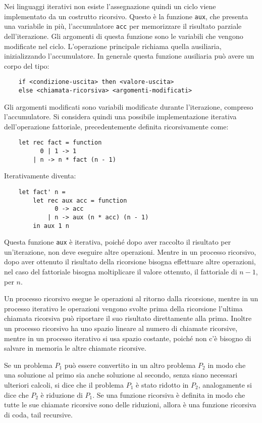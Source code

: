 \documentclass{article}
\numberwithin{equation}{subsection}
\begin{document}
Nei linguaggi iterativi non esiste l'assegnazione quindi un ciclo viene implementato da un costrutto ricorsivo. Questo è la funzione \verb|aux|, che presenta una variabile in più, l'accumulatore \verb|acc| per memorizzare il risultato parziale dell'iterazione. Gli argomenti di questa funzione sono le variabili che vengono modificate nel ciclo. L'operazione principale richiama quella ausiliaria, inizializzando l'accumulatore. In generale questa funzione ausiliaria può avere un corpo del tipo:
\begin{verbatim}
    if <condizione-uscita> then <valore-uscita>
    else <chiamata-ricorsiva> <argomenti-modificati>
\end{verbatim}
Gli argomenti modificati sono variabili modificate durante l'iterazione, compreso l'accumulatore. Si considera quindi una possibile implementazione iterativa dell'operazione fattoriale, precedentemente definita ricorsivamente come:
\begin{verbatim}
    let rec fact = function
          0 | 1 -> 1
        | n -> n * fact (n - 1)
\end{verbatim}
Iterativamente diventa:
\begin{verbatim}
    let fact' n = 
        let rec aux acc = function
              0 -> acc
            | n -> aux (n * acc) (n - 1)
        in aux 1 n
\end{verbatim}
Questa funzione \verb|aux| è iterativa, poiché dopo aver raccolto il risultato per un'iterazione, non deve eseguire altre operazioni. Mentre in un processo ricorsivo, dopo aver ottenuto il risultato della ricorsione bisogna effettuare altre operazioni, nel caso del fattoriale bisogna moltiplicare il valore ottenuto, il fattoriale di $n-1$, per $n$. 


Un processo ricorsivo esegue le operazioni al ritorno dalla ricorsione, mentre in un processo iterativo le operazioni vengono svolte prima della ricorsione l'ultima chiamata ricorsiva può riportare il suo risultato direttamente alla prima. Inoltre un processo ricorsivo ha uno spazio lineare al numero di chiamate ricorsive, mentre in un processo iterativo si usa spazio costante, poiché non c'è bisogno di salvare in memoria le altre chiamate ricorsive. 

Se un problema $P_1$ può essere convertito in un altro problema $P_2$ in modo che una soluzione al primo sia anche soluzione al secondo, senza siano necessari ulteriori calcoli, si dice che il problema $P_1$ è stato ridotto in $P_2$, analogamente si dice che $P_2$ è riduzione di $P_1$. Se una funzione ricorsiva è definita in modo che tutte le sue chiamate ricorsive sono delle riduzioni, allora è una funzione ricorsiva di coda, tail recursive. 
\end{document}
